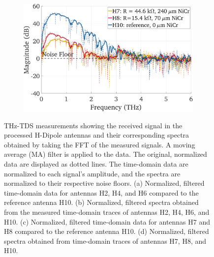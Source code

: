 \begin{figure}[!]
\begin{subfigure}[b]{0.49\textwidth}
        \caption{\centering}
        \label{comp_h10_h8_h7_time}
    \end{subfigure}
    \hfill
    \begin{subfigure}[b]{0.49\textwidth}
        \centering
        \includegraphics[height=0.6\textwidth]{figures/Results/mainTextComp/H10_H8_H7/H10_H8_H7_spectrum_nn.pdf}
        \caption{\centering}
        \label{comp_h10_h8_h7_spectrum}
    \end{subfigure}
    \caption{THz-TDS measurements showing the received signal in the processed H-Dipole antennas and their corresponding spectra obtained by taking the FFT of the measured signals. A moving average (MA) filter is applied to the data. The original, normalized data are displayed as dotted lines. The time-domain data are normalized to each signal’s amplitude, and the spectra are normalized to their respective noise floors. (a) Normalized, filtered time-domain data for antennas H2, H4, and H6 compared to the reference antenna H10. (b) Normalized, filtered spectra obtained from the measured time-domain traces of antennas H2, H4, H6, and H10. (c) Normalized, filtered time-domain data for antennas H7 and H8 compared to the reference antenna H10. (d) Normalized, filtered spectra obtained from time-domain traces of antennas H7, H8, and H10.}
    \label{comp_dipoles}
\end{figure}

